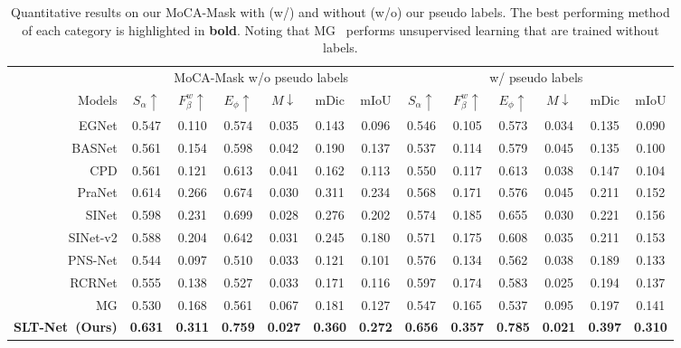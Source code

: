 \documentclass[10pt,twocolumn,letterpaper]{article}
\def\Ourmodel{SLT-Net}
\begin{document}
\begin{table*}[t!]
  \footnotesize
  \centering
  \caption{Quantitative results on our MoCA-Mask with (w/) and without (w/o) our pseudo labels. The best performing method of each category is highlighted in \textbf{bold}. 
  Noting that MG~\cite{yang2021selfsupervised} performs unsupervised learning that are trained without labels.} 
  \label{tab:Moca}
  \vspace{-5pt}
  \tabcolsep=0.3cm
  \renewcommand{\arraystretch}{0.6}
\begin{tabular}{r|cccccccccccc } 
  \toprule
  & \multicolumn{6}{c}{MoCA-Mask w/o pseudo labels} & \multicolumn{6}{c}{w/ pseudo labels} \\
  \cmidrule(lr){2-7}
  \cmidrule(lr){8-13}
  Models & $S_\alpha\uparrow$ &$F_\beta^w\uparrow$ &$E_\phi\uparrow$ &$M\downarrow$ & mDic & mIoU
  & $S_\alpha\uparrow$ &$F_\beta^w\uparrow$ &$E_\phi\uparrow$ &$M\downarrow$ & mDic & mIoU \\
  \cmidrule(lr){1-7}
  \cmidrule(lr){8-13}
  {EGNet} \cite{zhao2019EGNet} & 0.547 & 0.110 & 0.574 & 0.035 & 0.143 & 0.096 & 0.546 & 0.105 & 0.573  & 0.034 & 0.135 & 0.090 \\
  {BASNet} \cite{Qin_2019_CVPR}  & 0.561 & 0.154 & 0.598 & 0.042 & 0.190 & 0.137 & 0.537  & 0.114 & 0.579 & 0.045 & 0.135 & 0.100  \\
  {CPD} \cite{Wu_2019_CVPR} & 0.561 & 0.121 & 0.613 & 0.041 & 0.162 & 0.113 & 0.550 & 0.117 & 0.613 & 0.038 & 0.147 & 0.104 \\
  {PraNet} \cite{fan2020pra} & 0.614 & 0.266  & 0.674 & 0.030 & 0.311 & 0.234 & 0.568 & 0.171 & 0.576 & 0.045 & 0.211 & 0.152 \\
  {SINet}  \cite{fan2020Camouflage}  & 0.598 & 0.231 & 0.699 & 0.028 & 0.276 & 0.202  & 0.574 & 0.185  & 0.655 & 0.030 &  0.221 &  0.156 \\
  {SINet-v2} \cite{fan2021concealed}  & 0.588 & 0.204 & 0.642 & 0.031 & 0.245 & 0.180 & 0.571 & 0.175 & 0.608 & 0.035 & 0.211 & 0.153  \\

  \cmidrule(lr){1-7}
  \cmidrule(lr){8-13}
  {PNS-Net} \cite{ji2021progressively} & 0.544 & 0.097 &  0.510 & 0.033 & 0.121 & 0.101 & 0.576 & 0.134 & 0.562 & 0.038  & 0.189  & 0.133 \\
  {RCRNet} \cite{yan2019semi} & 0.555 &  0.138 &  0.527 &  0.033 &  0.171 & 0.116 & 0.597 & 0.174 & 0.583 & 0.025 & 0.194 & 0.137 \\
  {MG} \cite{yang2021selfsupervised}  &  0.530 & 0.168  & 0.561 &  0.067  & 0.181  & 0.127  & 0.547 & 0.165 &  0.537 &  0.095 & 0.197 & 0.141 \\

  \textbf{\Ourmodel~(Ours)} & \textbf{0.631} &  \textbf{0.311} &  \textbf{0.759} & \textbf{0.027} & \textbf{0.360} & \textbf{0.272} & \textbf{0.656} &  \textbf{0.357} & \textbf{0.785}  & \textbf{0.021}  & \textbf{0.397}  &  \textbf{0.310} \\
  \bottomrule
  \end{tabular}
\end{table*}
\end{document}
